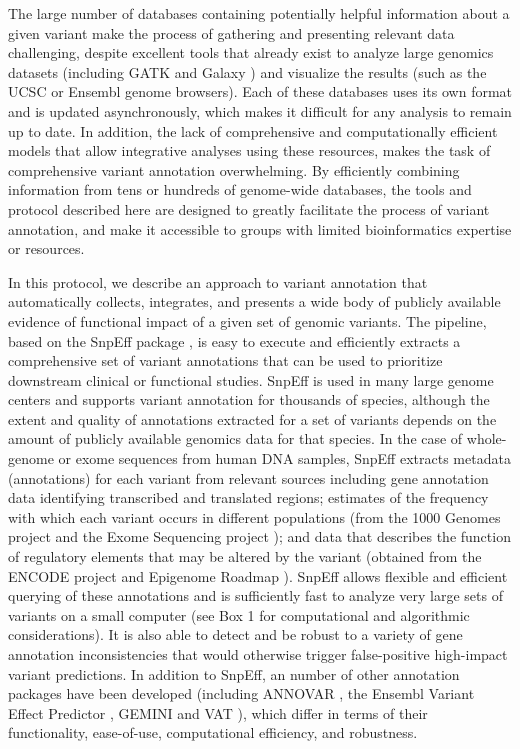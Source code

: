 The large number of databases containing potentially helpful information about a given variant make the process of gathering and presenting relevant data challenging, despite excellent tools that already exist to analyze large genomics datasets (including GATK \cite{mckenna2010genome} and Galaxy \cite{goecks2010galaxy}) and visualize the results (such as the UCSC \cite{karolchik2014ucsc} or Ensembl \cite{flicek2012ensembl} genome browsers). Each of these databases uses its own format and is updated asynchronously, which makes it difficult for any analysis to remain up to date. In addition, the lack of comprehensive and computationally efficient models that allow integrative analyses using these resources, makes the task of comprehensive variant annotation overwhelming. By efficiently combining information from tens or hundreds of genome-wide databases, the tools and protocol described here are designed to greatly facilitate the process of variant annotation, and make it accessible to groups with limited bioinformatics expertise or resources.

In this protocol, we describe an approach to variant annotation that automatically collects, integrates, and presents a wide body of publicly available evidence of functional impact of a given set of genomic variants. The pipeline, based on the SnpEff package \cite{cingolani2012program}, is easy to execute and efficiently extracts a comprehensive set of variant annotations that can be used to prioritize downstream clinical or functional studies. SnpEff is used in many large genome centers and supports variant annotation for thousands of species, although the extent and quality of annotations extracted for a set of variants depends on the amount of publicly available genomics data for that species. In the case of whole-genome or exome sequences from human DNA samples, SnpEff extracts metadata (annotations) for each variant from relevant sources including gene annotation data identifying transcribed and translated regions; estimates of the frequency with which each variant occurs in different populations (from the 1000 Genomes project and the Exome Sequencing project \cite{10002012integrated}); and data that describes the function of regulatory elements that may be altered by the variant (obtained from the ENCODE project \cite{encode2012integrated} and Epigenome Roadmap \cite{bernstein2010nih}). SnpEff allows flexible and efficient querying of these annotations and is sufficiently fast to analyze very large sets of variants on a small computer (see Box 1 for computational and algorithmic considerations). It is also able to detect and be robust to a variety of gene annotation inconsistencies that would otherwise trigger false-positive high-impact variant predictions. In addition to SnpEff, an number of other annotation packages have been developed (including ANNOVAR \cite{wang2010annovar}, the Ensembl Variant Effect Predictor \cite{mclaren2010deriving}, GEMINI \cite{paila2013gemini} and VAT \cite{habegger2012vat}), which differ in terms of their functionality, ease-of-use, computational efficiency, and robustness.

